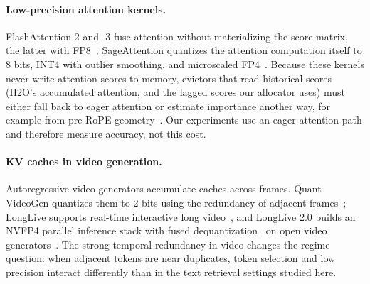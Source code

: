 \paragraph{Low-precision attention kernels.}
FlashAttention-2 and -3 fuse attention without materializing the score
matrix, the latter with FP8~\citep{dao2023flashattention2,shah2024flashattention3};
SageAttention quantizes the attention computation itself to 8 bits, INT4 with
outlier smoothing, and microscaled FP4~\citep{zhang2024sageattention,zhang2024sageattention2,zhang2025sageattention3}.
Because these kernels never write attention scores to memory, evictors that
read historical scores (H2O's accumulated attention, and the lagged scores our
allocator uses) must either fall back to eager attention or estimate
importance another way, for example from pre-RoPE geometry~\citep{mao2026triattention}.
Our experiments use an eager attention path and therefore measure accuracy,
not this cost.

\paragraph{KV caches in video generation.}
Autoregressive video generators accumulate caches across frames.  Quant
VideoGen quantizes them to 2 bits using the redundancy of adjacent
frames~\citep{xi2026quantvideogen}; LongLive supports real-time interactive
long video~\citep{yang2026longlive}, and LongLive 2.0 builds an NVFP4 parallel
inference stack with fused dequantization~\citep{chen2026longlive2} on open
video generators~\citep{wan2025wan}.  The strong temporal redundancy in video
changes the regime question: when adjacent tokens are near duplicates, token
selection and low precision interact differently than in the text retrieval
settings studied here.
